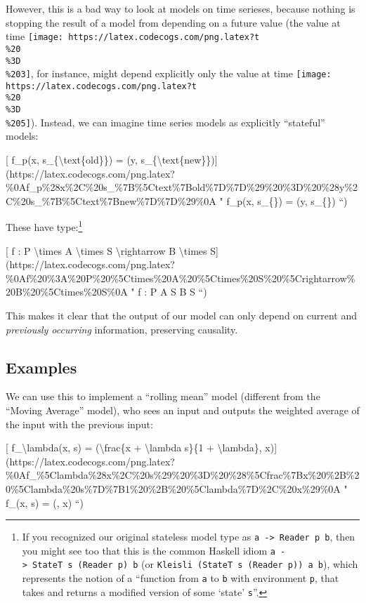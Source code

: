\documentclass[]{article}
\begin{document}
However, this is a bad way to look at models on time serieses, because nothing
is stopping the result of a model from depending on a future value (the value at
time \texttt{[image: https://latex.codecogs.com/png.latex?t\\\%20\\\%3D\\\%203]}, for
instance, might depend explicitly only the value at time
\texttt{[image: https://latex.codecogs.com/png.latex?t\\\%20\\\%3D\\\%205]}). Instead,
we can imagine time series models as explicitly ``stateful'' models:

{[} f\_p(x, s\_\{\textbackslash{}text\{old\}\}) = (y,
s\_\{\textbackslash{}text\{new\}\}){]}(https://latex.codecogs.com/png.latex?\%0Af\_p\%28x\%2C\%20s\_\%7B\%5Ctext\%7Bold\%7D\%7D\%29\%20\%3D\%20\%28y\%2C\%20s\_\%7B\%5Ctext\%7Bnew\%7D\%7D\%29\%0A
" f\_p(x, s\_\{\}) = (y, s\_\{\}) ``)

These have type:\footnote{If you recognized our original stateless model type as
  \texttt{a\ -\textgreater{}\ Reader\ p\ b}, then you might see too that this is
  the common Haskell idiom
  \texttt{a\ -\textgreater{}\ StateT\ s\ (Reader\ p)\ b} (or
  \texttt{Kleisli\ (StateT\ s\ (Reader\ p))\ a\ b}), which represents the notion
  of a ``function from \texttt{a} to \texttt{b} with environment \texttt{p},
  that takes and returns a modified version of some `state' \texttt{s}''.}

{[} f : P \textbackslash{}times A \textbackslash{}times S
\textbackslash{}rightarrow B \textbackslash{}times
S{]}(https://latex.codecogs.com/png.latex?\%0Af\%20\%3A\%20P\%20\%5Ctimes\%20A\%20\%5Ctimes\%20S\%20\%5Crightarrow\%20B\%20\%5Ctimes\%20S\%0A
" f : P \times A \times S \rightarrow B \times S ``)

This makes it clear that the output of our model can only depend on current and
\emph{previously occurring} information, preserving causality.

\hypertarget{examples}{%
\subsection{Examples}\label{examples}}

We can use this to implement a ``rolling mean'' model (different from the
``Moving Average'' model), who sees an input and outputs the weighted average of
the input with the previous input:

{[} f\_\textbackslash{}lambda(x, s) = (\textbackslash{}frac\{x +
\textbackslash{}lambda s\}\{1 + \textbackslash{}lambda\},
x){]}(https://latex.codecogs.com/png.latex?\%0Af\_\%5Clambda\%28x\%2C\%20s\%29\%20\%3D\%20\%28\%5Cfrac\%7Bx\%20\%2B\%20\%5Clambda\%20s\%7D\%7B1\%20\%2B\%20\%5Clambda\%7D\%2C\%20x\%29\%0A
" f\_\lambda(x, s) = (, x) ``)
\end{document}
